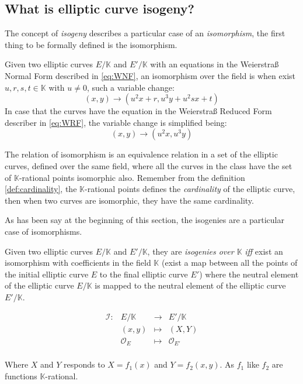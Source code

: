 \documentclass[10pt,a4paper,twoside]{llncs}
\begin{document}
\subsection{What is elliptic curve isogeny? \label{sec:isog}}

The concept of \emph{isogeny} describes a particular case of an \emph{isomorphism}, the first thing to be formally defined is the isomorphism.

\begin{definition}\label{def:isomorphism}
 Given two elliptic curves $E/\mathbb{K}$ and $E'/\mathbb{K}$ with an equations in the Weierstra\ss{} Normal Form described in \ref{eq:WNF}, an isomorphism over the field is when exist $u,r,s,t\in\mathbb{K}$ with $u\neq0$, such a variable change:
\begin{equation}\label{eq:isomorphisminWNF}
 (x,y) \rightarrow (u^2x+r,u^3y+u^2sx+t)
\end{equation}
In case that the curves have the equation in the Weierstra\ss{} Reduced Form describer in \ref{eq:WRF}, the variable change is simplified being:
\begin{equation}\label{eq:isomorphisminWRF}
 (x,y) \rightarrow (u^2x,u^3y)
\end{equation}
\end{definition}

The relation of isomorphism is an equivalence relation in a set of the elliptic curves, defined over the same field, where all the curves in the class have the set of $\mathbb{K}$-rational points isomorphic also. Remember from the definition \ref{def:cardinality}, the $\mathbb{K}$-rational points defines the \emph{cardinality} of the elliptic curve, then when two curves are isomorphic, they have the same cardinality.

As has been say at the beginning of this section, the isogenies are a particular case of isomorphisms.

\begin{definition}\label{def:isogeny}
 Given two elliptic curves $E/\mathbb{K}$ and $E'/\mathbb{K}$, they are \emph{isogenies over $\mathbb{K}$} \emph{iff} exist an isomorphism with coefficients in the field $\mathbb{K}$ (exist a map between all the points of the initial elliptic curve $E$ to the final elliptic curve $E'$) where the neutral element of the elliptic curve $E/\mathbb{K}$ is mapped to the neutral element of the elliptic curve $E'/\mathbb{K}$.

\begin{equation}\label{eq:isogenia}
        \begin{array}{cccc}
                \mathcal{I}: & E/\mathbb{K} & \rightarrow & E'/\mathbb{K} \\
                \;           & (x,y)        & \mapsto     & (X,Y) \\
                \;           & \mathcal{O}_{E} & \mapsto  & \mathcal{O}_{E'} \\
        \end{array}
\end{equation}

Where $X$ and $Y$ responds to $X=f_{1}(x)$ and $Y=f_{2}(x,y)$. As $f_{1}$ like $f_{2}$ are functions $\mathbb{K}$-rational.
\end{definition}
\end{document}
